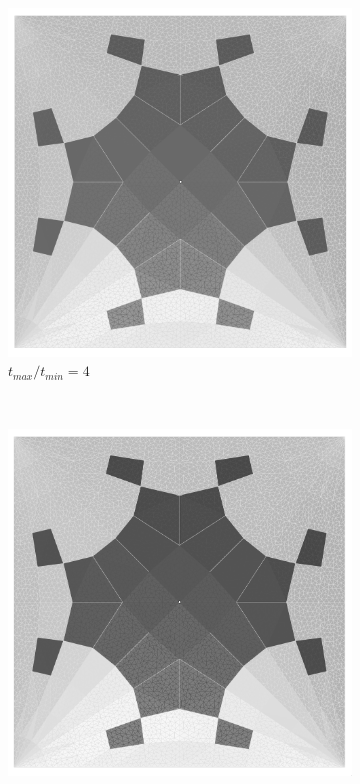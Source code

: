 \begin{figure}[H]
\begin{subfigure}[b]{.32\textwidth}
  \centering
  \includegraphics[width=.99\linewidth]{images/t_opt_l2d10_gamma4}
  \caption{$t_{max}/t_{min}=4$}
\end{subfigure}
~
\begin{subfigure}[b]{.32\textwidth}
  \centering
  \includegraphics[width=.99\linewidth]{images/t_opt_l2d10_gamma5}

\end{subfigure}
\end{figure}
